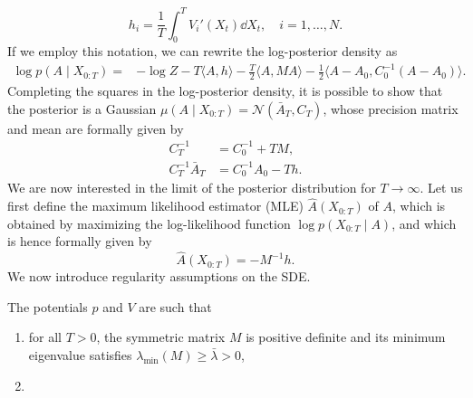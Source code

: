\documentclass[10pt]{article}
\begin{document}
\begin{equation}
	h_i = \frac1T \int_0^T V_i'(X_t) \dd X_t, \quad i = 1, \ldots, N.
\end{equation}
If we employ this notation, we can rewrite the log-posterior density as
\begin{equation}
\begin{aligned}
	\log p(A \mid X_{0:T}) = &-\log Z - T\langle A, h\rangle - \frac{T}{2} \langle A, M A\rangle - \frac12 \langle A - A_0, C_0^{-1}(A-A_0) \rangle.
\end{aligned}
\end{equation}
Completing the squares in the log-posterior density, it is possible to show that the posterior is a Gaussian $\mu(A \mid X_{0:T}) = \mathcal N(\bar A_T, C_T)$, whose precision matrix and mean are formally given by
\begin{equation}
\begin{aligned}
	C_T^{-1} &= C_0^{-1} + T M, \\
	C_T^{-1}\bar A_T &= C_0^{-1}A_0 - T h. 
\end{aligned}
\end{equation}
We are now interested in the limit of the posterior distribution for $T \to \infty$. Let us first define the maximum likelihood estimator (MLE) $\widehat A(X_{0:T})$ of $A$, which is obtained by maximizing the log-likelihood function $\log p(X_{0:T} \mid A)$, and which is hence formally given by
\begin{equation}
	\widehat A(X_{0:T}) = -M^{-1}h.
\end{equation}
We now introduce regularity assumptions on the SDE.
\begin{assumption}\label{as:regularity} The potentials $p$ and $V$ are such that 
	\begin{enumerate}
		\item for all $T > 0$, the symmetric matrix $M$ is positive definite and its minimum eigenvalue satisfies $\lambda_{\min}(M) \geq \bar \lambda > 0$,
		\item 	{}
	\end{enumerate}
\end{assumption}
\end{document}
